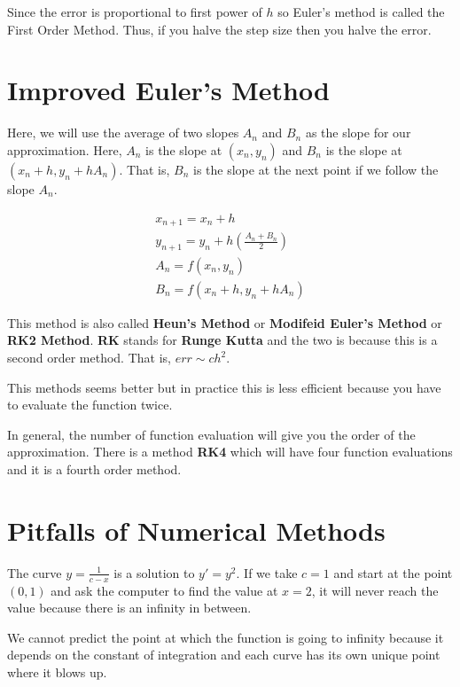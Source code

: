 Since the error is proportional to first power of $h$ so Euler's method is called the First Order Method.
Thus, if you halve the step size then you halve the error.

\pagebreak

\section{Improved Euler's Method}

Here, we will use the average of two slopes $A_n$ and $B_n$ as the slope for our approximation.
Here, $A_n$ is the slope at $(x_n, y_n)$ and $B_n$ is the slope at $(x_n + h, y_n + h A_n)$.
That is, $B_n$ is the slope at the next point if we follow the slope $A_n$.

\begin{gather*}
    x_{n+1} = x_n + h \\
    y_{n+1} = y_n + h \left( \frac{A_n + B_n}{2} \right) \\
    A_n = f(x_n, y_n) \\
    B_n = f(x_n + h, y_n + h A_n)
\end{gather*}


This method is also called {\bf Heun's Method} or {\bf Modifeid Euler's Method} or {\bf RK2 Method}.
{\bf RK} stands for {\bf Runge Kutta} and the two is because this is a second order method.
That is, $err \sim c h^2$.

This methods seems better but in practice this is less efficient because you have to evaluate the function twice.

In general, the number of function evaluation will give you the order of the approximation.
There is a method {\bf RK4} which will have four function evaluations and it is a fourth order method.

\section{Pitfalls of Numerical Methods}

The curve $y = \frac{1}{c-x}$ is a solution to $y' = y^2$. 
If we take $c = 1$ and start at the point $(0, 1)$ and ask the computer to find the value at $x = 2$,
it will never reach the value because there is an infinity in between.

We cannot predict the point at which the function is going to infinity because it depends on the constant of integration and each curve has its own unique point where it blows up.
